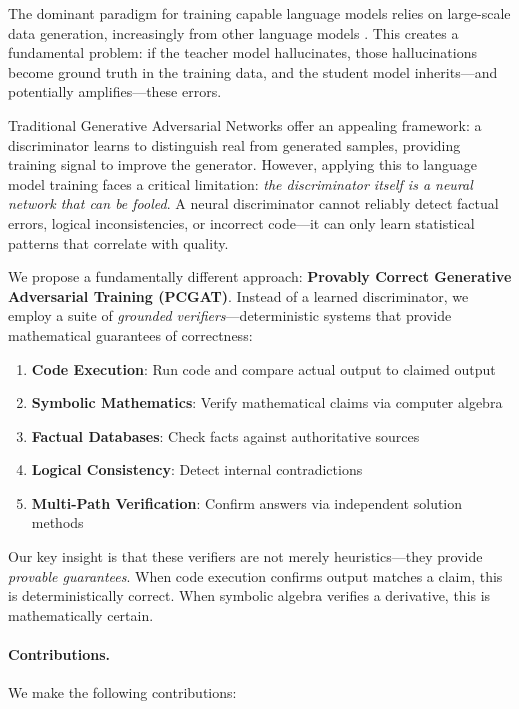 \documentclass[11pt,a4paper]{article}
\begin{document}
The dominant paradigm for training capable language models relies on large-scale data generation, increasingly from other language models \citep{alpaca,vicuna}. This creates a fundamental problem: if the teacher model hallucinates, those hallucinations become ground truth in the training data, and the student model inherits---and potentially amplifies---these errors.

Traditional Generative Adversarial Networks \citep{goodfellow2014gan} offer an appealing framework: a discriminator learns to distinguish real from generated samples, providing training signal to improve the generator. However, applying this to language model training faces a critical limitation: \emph{the discriminator itself is a neural network that can be fooled}. A neural discriminator cannot reliably detect factual errors, logical inconsistencies, or incorrect code---it can only learn statistical patterns that correlate with quality.

We propose a fundamentally different approach: \textbf{Provably Correct Generative Adversarial Training (PCGAT)}. Instead of a learned discriminator, we employ a suite of \emph{grounded verifiers}---deterministic systems that provide mathematical guarantees of correctness:

\begin{enumerate}
    \item \textbf{Code Execution}: Run code and compare actual output to claimed output
    \item \textbf{Symbolic Mathematics}: Verify mathematical claims via computer algebra
    \item \textbf{Factual Databases}: Check facts against authoritative sources
    \item \textbf{Logical Consistency}: Detect internal contradictions
    \item \textbf{Multi-Path Verification}: Confirm answers via independent solution methods
\end{enumerate}

Our key insight is that these verifiers are not merely heuristics---they provide \emph{provable guarantees}. When code execution confirms output matches a claim, this is deterministically correct. When symbolic algebra verifies a derivative, this is mathematically certain.

\paragraph{Contributions.} We make the following contributions:
\end{document}
